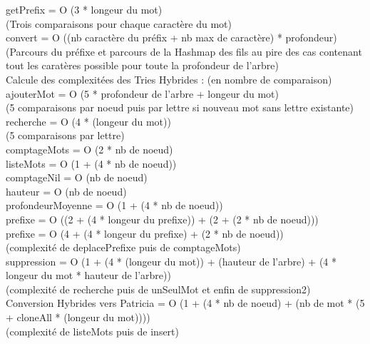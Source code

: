 \documentclass{article}
\begin{document}
getPrefix = O (3 * longeur du mot)\\
(Trois comparaisons pour chaque caract\`ere du mot)\\

convert = O ((nb caract\`ere du pr\'efix + nb max de caract\`ere) * profondeur)\\
(Parcours du pr\'efixe et parcours de la Hashmap des fils au pire des cas
contenant tout les carat\`eres possible pour toute la profondeur de l'arbre)\\

Calcule des complexit\'ees des Tries Hybrides : (en nombre de comparaison)\\

ajouterMot = O (5 * profondeur de l'arbre + longeur du mot)\\
(5 comparaisons par noeud puis par lettre si nouveau mot sans lettre existante)\\

recherche = O (4 * (longeur du mot))\\
(5 comparaisons par lettre)\\

comptageMots = O (2 * nb de noeud)\\

listeMots = O (1 + (4 * nb de noeud)) \\

comptageNil = O (nb de noeud)\\

hauteur = O (nb de noeud)\\

profondeurMoyenne = O (1 + (4 * nb de noeud))\\

prefixe = O ((2 + (4 * longeur du prefixe)) + (2 + (2 * nb de noeud)))\\
prefixe = O (4 + (4 * longeur du prefixe) + (2 * nb de noeud))\\
(complexit\'e de deplacePrefixe puis de comptageMots)\\

suppression = O (1 + (4 * (longeur du mot)) + (hauteur de l'arbre) + (4 * longeur du mot * hauteur de l'arbre))\\
(complexit\'e de recherche puis de unSeulMot et enfin de suppression2)\\

Conversion Hybrides vers Patricia = O (1 + (4 * nb de noeud) + (nb de mot * (5 + cloneAll * (longeur du mot))))\\
(complexit\'e de listeMots puis de insert)\\
\end{document}
